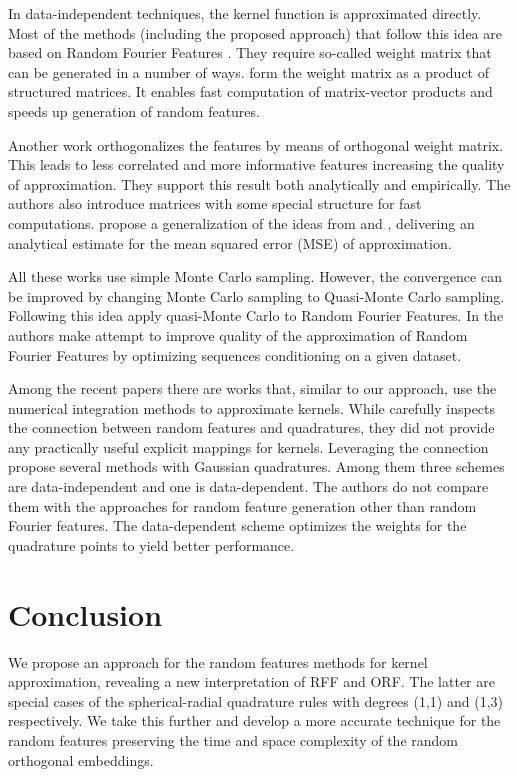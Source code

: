 In data-independent techniques, the kernel function is approximated directly. Most of the methods (including the proposed approach) that follow this idea are based on Random Fourier Features \citep{rahimi2008random}. They require so-called weight matrix that can be generated in a number of ways. \citep{le2013fastfood} form the weight matrix as a product of structured matrices. It enables fast computation of matrix-vector products and speeds up generation of random features.

Another work \citep{felix2016orthogonal} orthogonalizes the features by means of orthogonal weight matrix. This leads to less correlated and more informative features increasing the quality of approximation. They support this result both analytically and empirically. The authors also introduce matrices with some special structure for fast computations. \citep{choromanski2017unreasonable} propose a generalization of the ideas from \citep{le2013fastfood} and \citep{felix2016orthogonal}, delivering an analytical estimate for the mean squared error (MSE) of approximation.

All these works use simple Monte Carlo sampling. However, the convergence can be improved by changing Monte Carlo sampling to Quasi-Monte Carlo sampling. Following this idea \citep{yang2014quasi} apply quasi-Monte Carlo to Random Fourier Features. In \citep{yu2015compact} the authors make attempt to improve quality of the approximation of Random Fourier Features by optimizing sequences conditioning on a given dataset.

Among the recent papers there are works that, similar to our approach, use the numerical integration methods to approximate kernels. While \citep{bach2017equivalence} carefully inspects the connection between random features and quadratures, they did not provide any practically useful explicit mappings for kernels. Leveraging the connection \citep{dao2017gaussian} propose several methods with Gaussian quadratures. Among them three schemes are data-independent and one is data-dependent. The authors do not compare them with the approaches for random feature generation other than random Fourier features. The data-dependent scheme optimizes the weights for the quadrature points to yield better performance.

\section{Conclusion}
\label{sec:conclusion}
We propose an approach for the random features methods for kernel approximation, revealing a new interpretation of RFF and ORF. The latter are special cases of the spherical-radial quadrature rules with degrees (1,1) and (1,3) respectively. We take this further and develop a more accurate technique for the random features preserving the time and space complexity of the random orthogonal embeddings.

